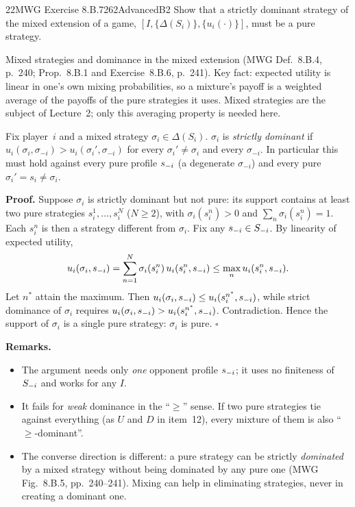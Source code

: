 \begin{exsol}{22}{MWG Exercise 8.B.7}{262}{Advanced}{B2}
\asked Show that a strictly dominant strategy of the mixed extension of a game,
$[I,\{\Delta(S_i)\}, \{u_i(\cdot)\}]$, must be a pure strategy.

\method Mixed strategies and dominance in the mixed extension (MWG Def.~8.B.4, p.~240;
Prop.~8.B.1 and Exercise~8.B.6, p.~241). Key fact: expected utility is linear in one's own
mixing probabilities, so a mixture's payoff is a weighted average of the payoffs of the pure
strategies it uses. Mixed strategies are the subject of Lecture~2; only this averaging property
is needed here.

\solution
Fix player~$i$ and a mixed strategy $\sigma_i \in \Delta(S_i)$. $\sigma_i$ is \emph{strictly
dominant} if $u_i(\sigma_i, \sigma_{-i}) > u_i(\sigma_i', \sigma_{-i})$ for every
$\sigma_i' \ne \sigma_i$ and every $\sigma_{-i}$. In particular this must hold against every pure
profile $s_{-i}$ (a degenerate $\sigma_{-i}$) and every pure $\sigma_i' = s_i \ne \sigma_i$.

\textbf{Proof.} Suppose $\sigma_i$ is strictly dominant but not pure: its support contains at
least two pure strategies $s_i^1, \dots, s_i^N$ ($N \ge 2$), with $\sigma_i(s_i^n) > 0$ and
$\sum_n \sigma_i(s_i^n) = 1$. Each $s_i^n$ is then a strategy different from $\sigma_i$. Fix any
$s_{-i} \in S_{-i}$. By linearity of expected utility,
\[
  u_i(\sigma_i, s_{-i}) = \sum_{n=1}^{N} \sigma_i(s_i^n)\, u_i(s_i^n, s_{-i})
  \le \max_{n} u_i(s_i^n, s_{-i}) .
\]
Let $n^*$ attain the maximum. Then $u_i(\sigma_i, s_{-i}) \le u_i(s_i^{n^*}, s_{-i})$, while strict
dominance of $\sigma_i$ requires $u_i(\sigma_i, s_{-i}) > u_i(s_i^{n^*}, s_{-i})$. Contradiction. Hence
the support of $\sigma_i$ is a single pure strategy: $\sigma_i$ is pure. \hfill$\square$

\textbf{Remarks.}
\begin{itemize}
  \item The argument needs only \emph{one} opponent profile $s_{-i}$; it uses no finiteness of
  $S_{-i}$ and works for any $I$.
  \item It fails for \emph{weak} dominance in the ``$\ge$'' sense. If two pure strategies tie
  against everything (as $U$ and $D$ in item~12), every mixture of them is also ``$\ge$-dominant''.
  \item The converse direction is different: a pure strategy can be strictly \emph{dominated} by a
  mixed strategy without being dominated by any pure one (MWG Fig.~8.B.5, pp.~240--241). Mixing can help
  in eliminating strategies, never in creating a dominant one.
\end{itemize}


\end{exsol}

